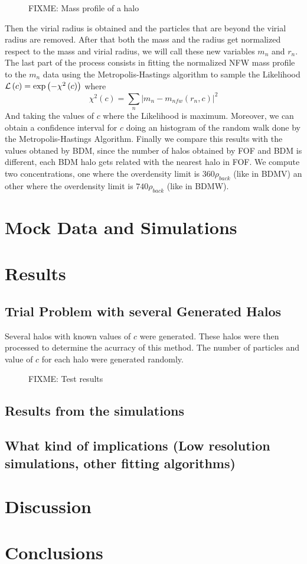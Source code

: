 \documentclass[useAMS,usenatbib]{mn2e}
\begin{document}
\begin{figure}[H]
\caption{FIXME: Mass profile of a halo}
\end{figure}

Then the virial radius is obtained and the particles that are beyond the virial radius are removed. After that both the mass and the radius get normalized respect to the mass and virial radius, we will call these new variables $m_{n}$ and $r_{n}$. The last part of the process consists in fitting the normalized NFW mass profile to the $m_{n}$ data using the Metropolis-Hastings algorithm to sample the Likelihood ${\cal L}\left(c\right)=\exp\left(-\chi^{2}\left(c\right)\right)$ where 
\[
\chi^{2}\left(c\right)=\sum\limits _{n}\left|m_{n}-m_{nfw}\left(r_{n},c\right)\right|^{2}
\]
And taking the values of $c$ where the Likelihood is maximum. Moreover, we can obtain a confidence interval for $c$ doing an histogram of the random walk done by the Metropolis-Hastings Algorithm. Finally we compare this results with the values obtaned by BDM, since the number of halos obtained by FOF and BDM is different, each BDM halo gets related with the nearest halo in FOF. We compute two concentrations, one where the overdensity limit is $360\rho_{back}$ (like in BDMV) an other where the overdensity limit is $740\rho_{back}$ (like in BDMW).

\section{Mock Data and Simulations}
\label{sec:data}
\section{Results}
\label{sec:results}

\subsection{Trial Problem with several Generated Halos}


Several halos with known values of $c$ were generated. These halos were then processed to determine the acurracy of this method. The number of particles and value of $c$ for each halo were generated randomly. 
\begin{figure}[H]
\caption{FIXME: Test results}
\end{figure}



\subsection{Results from the simulations}


\subsection{What kind of implications (Low resolution simulations, other fitting algorithms)} 


\section{Discussion}
\label{sec:discussion}


\section{Conclusions}
\label{sec:conclusions}




\end{document}
